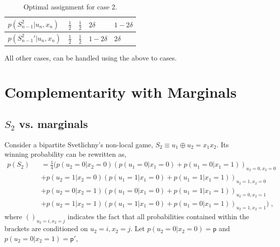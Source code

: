 \begin{widetext}
\begin{appendices}
\begin{enumerate}
\begin{table}[!htb]
\begin{tabular} {|l|l|l|l|l|}
$p({S_{n-1}^2}|u_n,x_n)$&$\frac{1}{2}$ & $\frac{1}{2}$ & $2\delta$&$1-2\delta$\\ \hline

$p({S_{n-1}^2}'|u_n,x_n)$& $\frac{1}{2}$ & $\frac{1}{2}$ & $1-2\delta$ &$2\delta$\\ \hline
\end{tabular}

\caption{Optimal assignment for case 2.} 
\label{Sncase2}
\end{table}
\end{enumerate} 
All other cases, can be handled using the above to cases.
\section{Complementarity with Marginals}
\subsection*{ $S_2$ {vs. marginals} }
\noindent
Consider a bipartite Svetlichny's non-local game, $S_2 \equiv u_1 \oplus u_2 =x_1x_2$. Its winning probability can be rewritten as,
\begin{eqnarray}
\label{Chsh_vs_marginal_pwin_breakdown}
p(S_2) &&= \frac{1}{4} \bigg( p(u_2=0|x_2=0)(p(u_1=0|x_1=0)+p(u_1=0|x_1=1))_{u_2=0,x_2=0}
{}\nonumber\\&&+p(u_2=1|x_2=0)(p(u_1=1|x_1=0)+p(u_1=1|x_1=1))_{u_2=1,x_2=0}
{}\nonumber\\&&
+p(u_2=0|x_2=1)(p(u_1=0|x_1=0)+p(u_1=1|x_1=1))_{u_2=0,x_2=1}{}\nonumber\\&&+p(u_2=1|x_2=1)(p(u_1=1|x_1=0)+p(u_1=0|x_1=1))_{u_2=1,x_2=1} \bigg) {} \; ,
\end{eqnarray}
\noindent
where $()_{u_2=i,x_2=j}$ indicates the fact that all probabilities contained within the brackets are conditioned on $u_2=i,x_2=j$. Let $p(u_2=0|x_2=0)=\mathsf{p}$ and $p(u_2=0|x_2=1)=\mathsf{p}'$, 

\end{appendices}
\end{widetext}
